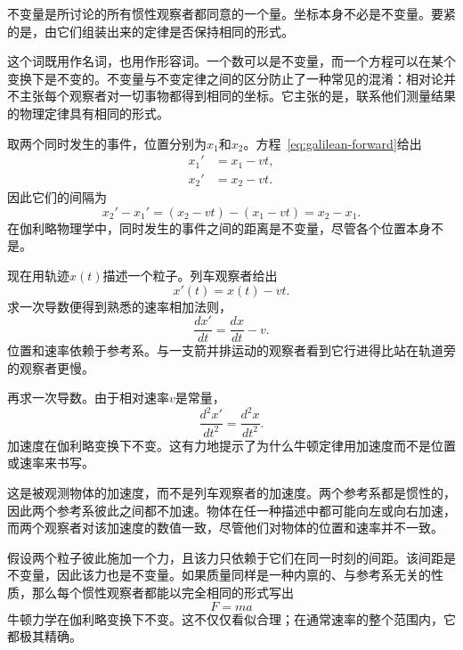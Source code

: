 不变量是所讨论的所有惯性观察者都同意的一个量。坐标本身不必是不变量。要紧的是，由它们组装出来的定律是否保持相同的形式。

这个词既用作名词，也用作形容词。一个数可以是不变量，而一个方程可以在某个变换下是不变的。不变量与不变定律之间的区分防止了一种常见的混淆：相对论并不主张每个观察者对一切事物都得到相同的坐标。它主张的是，联系他们测量结果的物理定律具有相同的形式。

取两个同时发生的事件，位置分别为\(x_1\)和\(x_2\)。方程~\eqref{eq:galilean-forward}给出
\begin{align}
x_1'&=x_1-vt,\\
x_2'&=x_2-vt.
\end{align}
因此它们的间隔为
\begin{equation}
x_2'-x_1'=(x_2-vt)-(x_1-vt)=x_2-x_1.
\end{equation}
在伽利略物理学中，同时发生的事件之间的距离是不变量，尽管各个位置本身不是。

\begin{classroomqa}
\end{classroomqa}

现在用轨迹\(x(t)\)描述一个粒子。列车观察者给出
\begin{equation}
x'(t)=x(t)-vt.
\end{equation}
求一次导数便得到熟悉的速率相加法则，
\begin{equation}
\frac{dx'}{dt}=\frac{dx}{dt}-v.
\end{equation}
位置和速率依赖于参考系。与一支箭并排运动的观察者看到它行进得比站在轨道旁的观察者更慢。

再求一次导数。由于相对速率\(v\)是常量，
\begin{equation}
\frac{d^2x'}{dt^2}=\frac{d^2x}{dt^2}.
\end{equation}
加速度在伽利略变换下不变。这有力地提示了为什么牛顿定律用加速度而不是位置或速率来书写。

这是被观测物体的加速度，而不是列车观察者的加速度。两个参考系都是惯性的，因此两个参考系彼此之间都不加速。物体在任一种描述中都可能向左或向右加速，而两个观察者对该加速度的数值一致，尽管他们对物体的位置和速率并不一致。

假设两个粒子彼此施加一个力，且该力只依赖于它们在同一时刻的间距。该间距是不变量，因此该力也是不变量。如果质量同样是一种内禀的、与参考系无关的性质，那么每个惯性观察者都能以完全相同的形式写出
\begin{equation}
F=ma
\end{equation}
牛顿力学在伽利略变换下不变。这不仅仅看似合理；在通常速率的整个范围内，它都极其精确。

